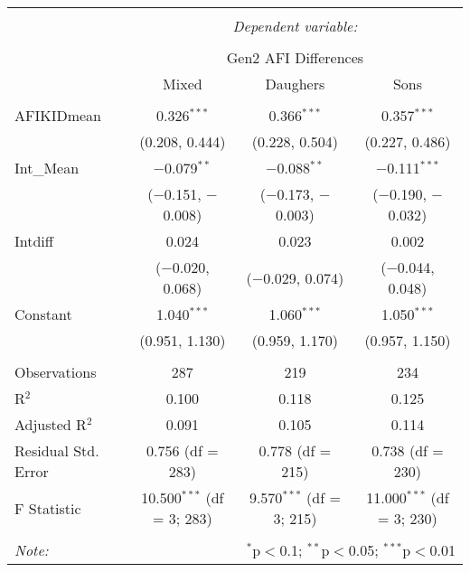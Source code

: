 
\begingroup 
\small 
\begin{tabular}{@{\extracolsep{1pt}}lccc} 
\\[-1.8ex]\hline 
\hline \\[-1.8ex] 
 & \multicolumn{3}{c}{\textit{Dependent variable:}} \\ 
\cline{2-4} 
\\[-1.8ex] & \multicolumn{3}{c}{Gen2 AFI Differences} \\ 
 & Mixed & Daughers & Sons \\ 
\hline \\[-1.8ex] 
 AFIKIDmean & 0.326$^{***}$ & 0.366$^{***}$ & 0.357$^{***}$ \\ 
  & (0.208, 0.444) & (0.228, 0.504) & (0.227, 0.486) \\ 
  Int\_Mean & $-$0.079$^{**}$ & $-$0.088$^{**}$ & $-$0.111$^{***}$ \\ 
  & ($-$0.151, $-$0.008) & ($-$0.173, $-$0.003) & ($-$0.190, $-$0.032) \\ 
  Intdiff & 0.024 & 0.023 & 0.002 \\ 
  & ($-$0.020, 0.068) & ($-$0.029, 0.074) & ($-$0.044, 0.048) \\ 
  Constant & 1.040$^{***}$ & 1.060$^{***}$ & 1.050$^{***}$ \\ 
  & (0.951, 1.130) & (0.959, 1.170) & (0.957, 1.150) \\ 
 \hline \\[-1.8ex] 
Observations & 287 & 219 & 234 \\ 
R$^{2}$ & 0.100 & 0.118 & 0.125 \\ 
Adjusted R$^{2}$ & 0.091 & 0.105 & 0.114 \\ 
Residual Std. Error & 0.756 (df = 283) & 0.778 (df = 215) & 0.738 (df = 230) \\ 
F Statistic & 10.500$^{***}$ (df = 3; 283) & 9.570$^{***}$ (df = 3; 215) & 11.000$^{***}$ (df = 3; 230) \\ 
\hline 
\hline \\[-1.8ex] 
\textit{Note:}  & \multicolumn{3}{r}{$^{*}$p$<$0.1; $^{**}$p$<$0.05; $^{***}$p$<$0.01} \\ 
\end{tabular} 
\endgroup 
